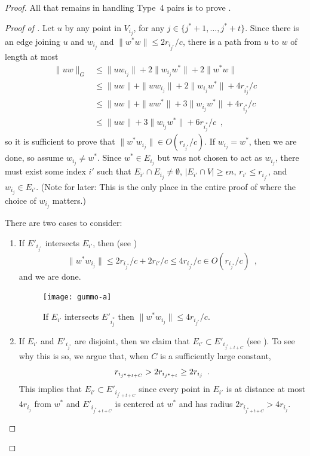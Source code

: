 \documentclass{patmorin}
\begin{document}
\begin{proof}
  All that remains in handling Type~4 pairs is to prove .

  \begin{proof}[Proof of ]
  Let $u$ by any point in $V_{i_{j}}$, for any
  $j\in\{j^*+1,\ldots,j^*+t\}$.  Since there is an edge joining $u$ and
  $w_{i_{j}}$ and $\|w^*w\|\le 2r_{i_{j^*}}/c$, there is a path from $u$
  to $w$ of length at most
  \begin{align*}
      \|uw\|_G & \le \|uw_{i_j}\| + 2\|w_{i_j}w^*\| + 2\|w^*w\|  \\
         & \le \|uw\| + \|ww_{i_j}\| + 2\|w_{i_j}w^*\| + 4r_{i_j^*}/c  \\
         & \le \|uw\| + \|ww^*\| + 3\|w_{i_j}w^*\| + 4r_{i_j^*}/c \\
         & \le \|uw\| + 3\|w_{i_j}w^*\| + 6r_{i_j^*}/c 
     \enspace ,
  \end{align*}
  so it is sufficient to prove that $\|w^*w_{i_{j}}\|\in
  O(r_{i_{j^*}}/c)$.  If $w_{i_{j}}=w^*$, then we are done, so assume
  $w_{i_{j}}\neq w^*$.  Since $w^*\in E_{i_{j}}$ but was not chosen
  to act as $w_{i_{j}}$, there must exist some index $i'$ such that
  $E_{i'}\cap E_{i_{j}}\neq\emptyset$, $|E_{i'}\cap V|\ge\epsilon n$,
  $r_{i'}\le r_{i_{j^*}}$, and $w_{i_{j}}\in E_{i'}$. (Note for later:
  This is the only place in the entire proof of 
  where the choice of $w_{i_j}$ matters.)

  \noindent There are two cases to consider:
  \begin{enumerate}
    \item 
    If $E'_{i_{j^*}}$ intersects $E_{i'}$, then (see )
    \[
       \|w^*w_{i_j}\|\le 2r_{i_{j^*}}/c + 2r_{i'}/c \le 4r_{i_{j^*}}/c \in O(r_{i_{j^*}}/c) \enspace ,
    \]
    and we are done. 
    \begin{figure}
      \begin{center}
        \texttt{[image: gummo-a]}
        \caption{If $E_{i'}$ intersects $E'_{i_j^*}$ then $\|w^*w_{i_j}\|\le 4r_{i_{j^*}}/c$.}
      \end{center}
    \end{figure}
  
    \item If $E_{i'}$ and $E'_{i_{j^*}}$ are disjoint, then we claim that
    $E_{i'}\subset E'_{i_{j^*+t+C}}$ (see ).  To see why
    this is so, we argue that, when $C$ is a sufficiently large constant,
    \begin{equation}
      r_{i_{j^*+t+C}} > 2r_{i_{j^*+t}} 
          \ge 2r_{i_j} \enspace . \eqlabel{xxxx}
    \end{equation}
    This implies that $E_{i'}\subset E'_{i_{j^*+t+C}}$ since every
    point in $E_{i'}$ is at distance at most $4r_{i_j}$ from $w^*$
    and $E'_{i_{j^*+t+C}}$ is centered at $w^*$ and has radius
    $2r_{i_{j^*+t+C}} > 4r_{i_j}$.


\end{enumerate}
\end{proof}
\end{proof}
\end{document}
